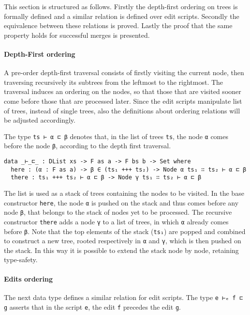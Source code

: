 \documentclass[../Thesis.tex]{subfiles}
\begin{document}
	This section is structured as follows. Firstly the depth-first ordering on trees
	is formally defined and a similar relation is defined over
	edit scripts. Secondly the equivalence
	between these relations is proved. Lastly the proof that the same 
	property holds for successful merges is presented.
	
	\paragraph{Depth-First ordering}
	A pre-order depth-first traversal consists of
	firstly visiting the current node, then traversing recursively its subtrees 	
	from the leftmost to the rightmost.
	The traversal induces an ordering on the nodes, so that those that
	are visited sooner come before those that are processed later.
	Since the edit scripts manipulate list of trees, instead of single trees,
	also the definitions about ordering relations will be adjusted accordingly.

	The type \texttt{ts ⊢ α ⊏ β} denotes that, in the list of trees \texttt{ts}, 
	the node \texttt{α} comes before the node \texttt{β}, according to the
	depth first traversal.
	
\begin{verbatim}
data _⊢_⊏_ : DList xs -> F as a -> F bs b -> Set where
  here : (α : F as a) -> β ∈ (ts₁ +++ ts₂) -> Node α ts₁ ∷ ts₂ ⊢ α ⊏ β
  there : ts₁ +++ ts₂ ⊢ α ⊏ β -> Node γ ts₁ ∷ ts₂ ⊢ α ⊏ β
\end{verbatim}

	The list is used as a stack of trees containing the nodes to be visited.
	In the base constructor \texttt{here}, the node \texttt{α} is pushed on the 
	stack and thus comes before any node \texttt{β}, that belongs to the
	stack of nodes yet to be processed.
	The recursive constructor \texttt{there} adds a node \texttt{γ} to a list of 
	trees, in which \texttt{α} already comes before \texttt{β}.
	Note that the top elements of the stack (\texttt{ts₁}) are popped 
	and combined to construct a new tree, rooted respectively 
	in \texttt{α} and \texttt{γ}, which is then pushed on the stack. 
	In this way it is possible to extend the stack node by node, 
	retaining type-safety. 
	
	\paragraph{Edits ordering}
	The next data type defines a similar relation for edit scripts.
	The type \texttt{e ⊢ₑ f ⊏ g} asserts that in the script \texttt{e}, the edit
	\texttt{f} precedes the edit \texttt{g}.
	
\end{document}
